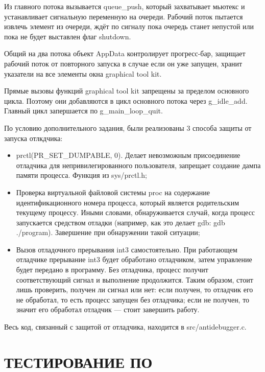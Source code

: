 \documentclass[a4paper,14pt]{extreport}
\begin{document}
Из главного потока вызывается queue\_push, который захватывает мьютекс и
устанавливает сигнальную переменную на очереди. Рабочий поток пытается извлечь
элемент из очереди, ждёт по сигналу пока очередь станет непустой или пока не
будет выставлен флаг shutdown.

Общий на два потока объект AppData контролирует прогресс-бар, защищает рабочий
поток от повторного запуска в случае если он уже запущен, хранит указатели на
все элементы окна graphical tool kit.

Прямые вызовы функций graphical tool kit запрещены за пределом основного цикла.
Поэтому они добавляются в цикл основного потока через g\_idle\_add. Главный
цикл запершается по g\_main\_loop\_quit.

По условию дополнительного задания, были реализованы 3 способа защиты от
запуска отлкдчика:
\begin{itemize}[leftmargin=*, label={--}]
	\item prctl(PR\_SET\_DUMPABLE, 0). Делает невозможным присоединение
		отладчика для непривилегированного пользователя, запрещает
		создание дампа памяти процесса. Функция из sys/prctl.h;
	\item Проверка виртуальной файловой системы proc на содержание
		идентификационного номера процесса, который является
		родительским текущему процессу. Иными словами, обнаруживается
		случай, когда процесс запускается средством отладки (например,
		как это делает gdb: gdb ./program). Завершение при обнаружении
		такой ситуации;
	\item Вызов отладочного прерывания int3 самостоятельно. При работающем
		отладчике прерывание int3 будет обработано отладчиком, затем
		управление будет передано в программу. Без отладчика, процесс
		получит соответствующий сигнал и выполнение продолжится. Таким
		образом, стоит лишь проверить, получен ли сигнал или нет: если
		получен, то отладчик его не обработал, то есть процесс запущен
		без отладчика; если не получен, то значит его обработал
		отладчик --- стоит завершить работу.
\end{itemize}
Весь код, связанный с защитой от отладчика, находится в src/antidebugger.c.


\newpage
\chapter*{ТЕСТИРОВАНИЕ ПО}
\end{document}
